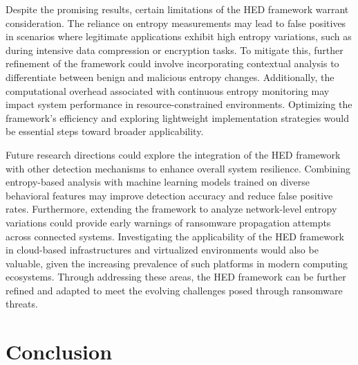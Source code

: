 \documentclass[lettersize,journal]{IEEEtran}
\begin{document}
Despite the promising results, certain limitations of the HED framework warrant consideration. The reliance on entropy measurements may lead to false positives in scenarios where legitimate applications exhibit high entropy variations, such as during intensive data compression or encryption tasks. To mitigate this, further refinement of the framework could involve incorporating contextual analysis to differentiate between benign and malicious entropy changes. Additionally, the computational overhead associated with continuous entropy monitoring may impact system performance in resource-constrained environments. Optimizing the framework's efficiency and exploring lightweight implementation strategies would be essential steps toward broader applicability.

Future research directions could explore the integration of the HED framework with other detection mechanisms to enhance overall system resilience. Combining entropy-based analysis with machine learning models trained on diverse behavioral features may improve detection accuracy and reduce false positive rates. Furthermore, extending the framework to analyze network-level entropy variations could provide early warnings of ransomware propagation attempts across connected systems. Investigating the applicability of the HED framework in cloud-based infrastructures and virtualized environments would also be valuable, given the increasing prevalence of such platforms in modern computing ecosystems. Through addressing these areas, the HED framework can be further refined and adapted to meet the evolving challenges posed through ransomware threats.



\section{Conclusion}
\end{document}
